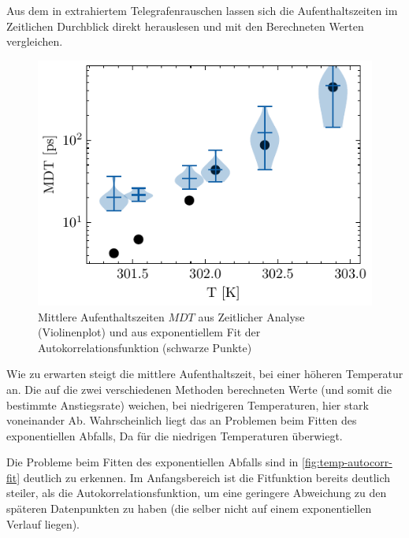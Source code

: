 \documentclass[main.tex]{subfiles}
\begin{document}

Aus dem in extrahiertem Telegrafenrauschen lassen sich die Aufenthaltszeiten im Zeitlichen Durchblick direkt herauslesen und mit den Berechneten Werten vergleichen. 

\begin{figure}[H]
    \centering
    \includegraphics{bilder/plots/temp_comparison/mean_dwell_time_comparison.pdf}
    \caption{Mittlere Aufenthaltszeiten $MDT$ aus Zeitlicher Analyse (Violinenplot) und aus exponentiellem Fit der Autokorrelationsfunktion (schwarze Punkte) }\label{fig:temp-mdt-comp}
\end{figure}

Wie zu erwarten steigt die mittlere Aufenthaltszeit, bei einer höheren Temperatur an. Die auf die zwei verschiedenen Methoden berechneten Werte (und somit die bestimmte Anstiegsrate) weichen, bei niedrigeren Temperaturen, hier stark voneinander Ab. 
Wahrscheinlich liegt das an Problemen beim Fitten des exponentiellen Abfalls, Da für die niedrigen Temperaturen  überwiegt.


Die Probleme beim Fitten des exponentiellen Abfalls sind in \cref{fig:temp-autocorr-fit} deutlich zu erkennen. Im Anfangsbereich ist die Fitfunktion bereits deutlich steiler, als die Autokorrelationsfunktion, um eine geringere Abweichung zu den späteren Datenpunkten zu haben (die selber nicht auf einem exponentiellen Verlauf liegen).
\end{document}
